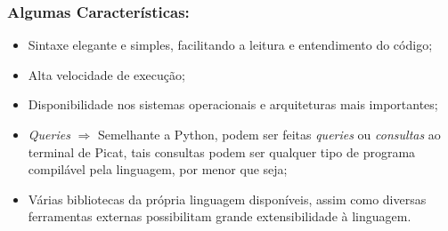 \begin{frame}[fragile]
    \frametitle{Algumas Características:}

    \begin{itemize}
    
      \item Sintaxe elegante e simples, facilitando a leitura e entendimento do código;
      
      \item Alta velocidade de execução;
      
      \item Disponibilidade nos sistemas operacionais e arquiteturas mais importantes;
      
      \item \textit{Queries} $\Rightarrow$ Semelhante a Python, podem ser feitas \textit{queries}
      ou \textit{consultas} ao terminal de Picat, tais consultas podem ser qualquer tipo de 
      programa compilável pela linguagem, por menor que seja;
      
      \item Várias bibliotecas da própria linguagem disponíveis, assim como diversas ferramentas
      externas possibilitam grande extensibilidade à linguagem.
      
      
    \end{itemize}
\end{frame}


